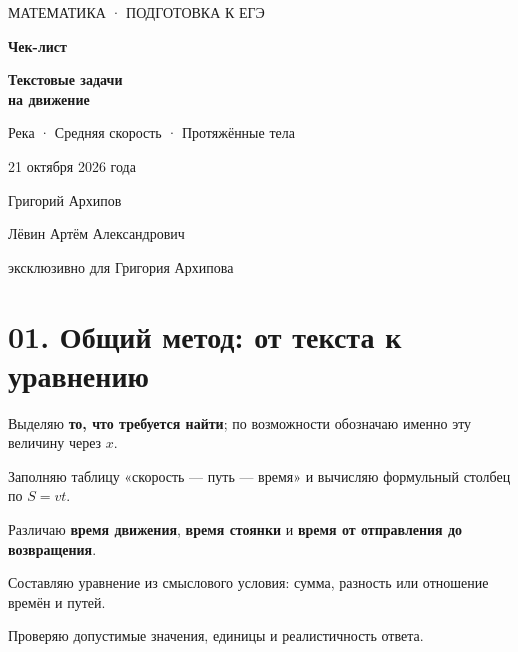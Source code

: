 \documentclass[a4paper,12pt]{article}
\newcommand{\ruleline}{\par\vspace{.15em}{\color{accent!65}\hrule height .6pt}\vspace{.65em}}
\newcommand{\checks}[1]{\item[$\square$] #1}
\begin{document}
\begin{titlepage}
\thispagestyle{empty}
\begin{center}
\vspace*{38mm}
{\color{accent}\small МАТЕМАТИКА · ПОДГОТОВКА К ЕГЭ}\par
\vspace{18mm}
{\fontsize{34}{42}\selectfont\bfseries Чек-лист}\par
\vspace{11mm}
{\fontsize{21}{29}\selectfont\bfseries Текстовые задачи\\на движение}\par
\vspace{5mm}
{\large Река · Средняя скорость · Протяжённые тела}\par
\vspace{22mm}
{\color{muted}\large 21 октября 2026 года}\par
\vspace{7mm}
{\color{darkaccent}\large Григорий Архипов}\par
\vfill
{\small Лёвин Артём Александрович}\par
{\small эксклюзивно для Григория Архипова}\par
\vspace{27mm}
\end{center}
\end{titlepage}

\section*{01. Общий метод: от текста к уравнению}
\ruleline
\begin{checklist}
\checks{Выделяю \textbf{то, что требуется найти}; по возможности обозначаю именно эту величину через $x$.}
\checks{Заполняю таблицу «скорость --- путь --- время» и вычисляю формульный столбец по $S=vt$.}
\checks{Различаю \textbf{время движения}, \textbf{время стоянки} и \textbf{время от отправления до возвращения}.}
\checks{Составляю уравнение из смыслового условия: сумма, разность или отношение времён и путей.}
\checks{Проверяю допустимые значения, единицы и реалистичность ответа.}
\end{checklist}
\end{document}
